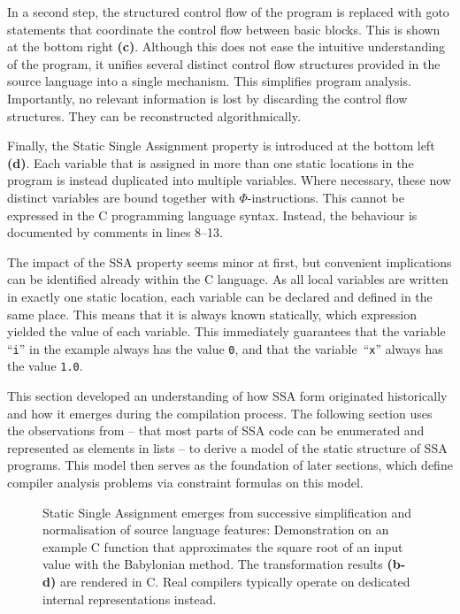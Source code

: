     In a second step, the structured control flow of the program is replaced
    with goto statements that coordinate the control flow between basic blocks.
    This is shown at the bottom right {\bf(c)}.
    Although this does not ease the intuitive understanding of the program, it
    unifies several distinct control flow structures provided in the source
    language into a single mechanism.
    This simplifies program analysis.
    Importantly, no relevant information is lost by discarding the control flow
    structures.
    They can be reconstructed algorithmically.

    Finally, the Static Single Assignment property is introduced at the bottom
    left {\bf(d)}.
    Each variable that is assigned in more than one static locations in the
    program is instead duplicated into multiple variables.
    Where necessary, these now distinct variables are bound together with
    $\Phi$-instructions.
    This cannot be expressed in the C programming language syntax.
    Instead, the behaviour is documented by comments in lines 8--13.

    The impact of the SSA property seems minor at first, but convenient
    implications can be identified already within the C language.
    As all local variables are written in exactly one static location, each
    variable can be declared and defined in the same place.
    This means that it is always known statically, which expression yielded the
    value of each variable.
    This immediately guarantees that the variable ``\texttt{i}'' in the example
    always has the value \texttt{0}, and that the variable~``\texttt{x}'' always
    has the value \texttt{1.0}.

    This section developed an understanding of how SSA form originated
    historically and how it emerges during the compilation process.
    The following section uses the observations from
     -- that most parts of SSA code can be enumerated
    and represented as elements in lists -- to derive a model of the static
    structure of SSA programs.
    This model then serves as the foundation of later sections, which define
    compiler analysis problems via constraint formulas on this model.

\begin{figure}[p]
    
    \caption{Static Single Assignment emerges from successive simplification
             and normalisation of source language features: 
             Demonstration on an example C function that approximates the
             square root of an input value with the Babylonian method.
             The transformation results {\bf (b-d)} are rendered in C.
             Real compilers typically operate on
             dedicated internal representations instead.
             \parfillskip=0pt}
    \label{ssaexample}
\end{figure}

